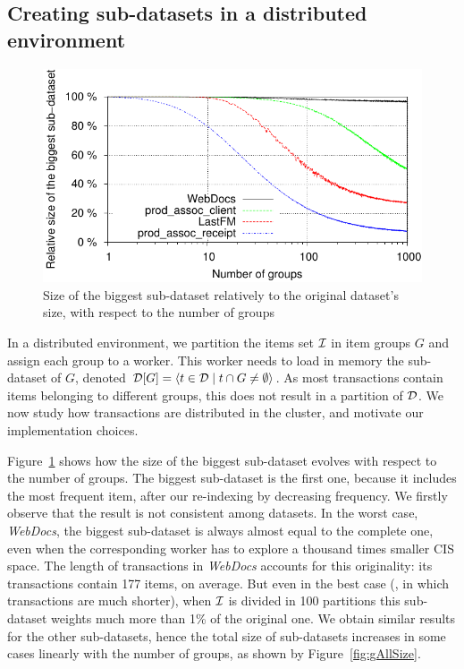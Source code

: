 \subsection{Creating sub-datasets in a distributed environment}
\label{sec:subdatasets}

\begin{figure}
	\centering
	\includegraphics{fig/toppi/G0size/relativeSize.pdf}
	\caption{\label{fig:g0size}Size of the biggest sub-dataset
		relatively to the original dataset's size,
		with respect to the number of groups}
\end{figure}

In a distributed environment,
we partition the items set ${\cal I}$ in item groups $G$ and assign each group to a worker.
This worker needs to load in memory the sub-dataset of $G$,
denoted ${\cal D}[G] = \langle t \in {\cal D} \mid t \cap G \neq \emptyset \rangle$.
As most transactions contain items belonging to different groups,
this does not result in a partition of ${\cal D}$.
We now study how transactions are distributed in the cluster,
and motivate our implementation choices.

Figure~\ref{fig:g0size} shows how the size of the biggest sub-dataset
evolves with respect to the number of groups.
The biggest sub-dataset is the first one,
because it includes the most frequent item, after our re-indexing by decreasing frequency.
We firstly observe that the result is not consistent among datasets.
In the worst case, {\em WebDocs}, the biggest sub-dataset is always almost equal to the complete one,
even when the corresponding worker has to explore a thousand times smaller CIS space.
The length of transactions in {\em WebDocs} accounts for this originality:
its transactions contain 177 items, on average.
But even in the best case
(\prodassocreceipt, in which transactions are much shorter),
when $\cal I$ is divided in 100 partitions this sub-dataset weights much more than 1\% of the original one.
We obtain similar results for the other sub-datasets,
hence the total size of sub-datasets increases in some cases linearly with the number of groups,
as shown by Figure~\ref{fig:gAllSize}.

